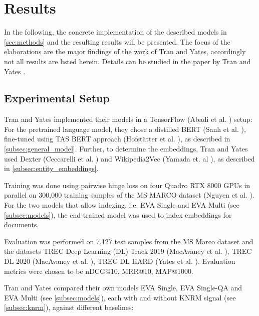 \section{Results}\label{sec:results}

In the following, the concrete implementation of the described models in \autoref{sec:methods} and the resulting results will be presented. The focus of the elaborations are the major findings of the work of Tran and Yates, accordingly not all results are listed herein. Details can be studied in the paper by Tran and Yates \cite{tran2022dense}.

\subsection{Experimental Setup}

Tran and Yates implemented their models in a TensorFlow (Abadi et al. \cite{abadi2016tensorflow}) setup: For the pretrained language model, they chose a distilled BERT (Sanh et al. \cite{sanh2019distilbert}), fine-tuned using TAS BERT approach (Hofst{\"a}tter et al. \cite{tasbert}), as described in \autoref{subsec:general_model}. Further, to determine the embeddings, Tran and Yates used Dexter (Ceccarelli et al. \cite{ceccarelli2013dexter}) and Wikipedia2Vec (Yamada et. al \cite{yamada2018wikipedia2vec}), as described in \autoref{subsec:entity_embeddings}. 

Training was done using pairwise hinge loss on four Quadro RTX 8000 GPUs in parallel on 300,000 training samples of the MS MARCO dataset (Nguyen et al. \cite{nguyen2016ms}). For the two models that allow indexing, i.e. EVA Single and EVA Multi (see \autoref{subsec:models}), the end-trained model was used to index embeddings for documents.

Evaluation was performed on 7,127 test samples from the MS Marco dataset and the datasets TREC Deep Learning (DL) Track 2019 (MacAvaney et al. \cite{trec_dl_2019}), TREC DL 2020 (MacAvaney et al. \cite{trec_dl_2020}), TREC DL HARD (Yates et al. \cite{dl_hard}). Evaluation metrics were chosen to be nDCG@10, MRR@10, MAP@1000.

Tran and Yates compared their own models EVA Single, EVA Single-QA and EVA Multi (see \autoref{subsec:models}), each with and without KNRM signal (see \autoref{subsec:knrm}), against different baselines:


